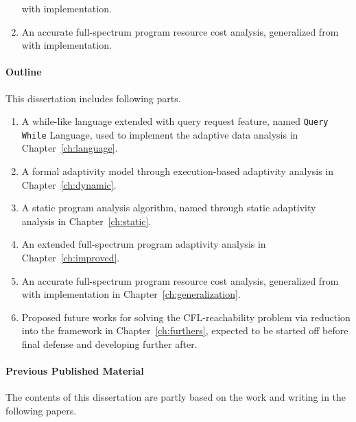 \begin{enumerate}
    with implementation.
   \item An accurate full-spectrum program resource cost analysis, 
   generalized from {\THESYSTEM} with implementation.
\end{enumerate}
%
\paragraph*{Outline}
This dissertation includes following parts. 
\begin{enumerate}
\item A while-like language extended with query request feature, named {\tt Query While} Language, 
used to implement 
the adaptive data analysis in Chapter~\ref{ch:language}.
\item A formal adaptivity model through execution-based adaptivity analysis in Chapter~\ref{ch:dynamic}.
\item A static program analysis algorithm, named {\THESYSTEM} through static adaptivity analysis in Chapter~\ref{ch:static}.
\item An extended full-spectrum program adaptivity analysis in Chapter~\ref{ch:improved}.
\item An accurate full-spectrum program resource cost analysis, 
generalized from {\THESYSTEM} with implementation in Chapter~\ref{ch:generalization}.
\item Proposed future works for solving the CFL-reachability problem via reduction into the {\THESYSTEM} framework in
Chapter~\ref{ch:furthers},
expected to be started off before final defense and developing further after.
\end{enumerate}



\paragraph{Previous Published Material}
The contents of this dissertation are partly based on the work and writing in the following papers.



